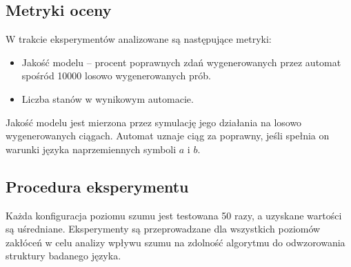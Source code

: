 \subsection{Metryki oceny}  
W trakcie eksperymentów analizowane są następujące metryki:  
\begin{itemize}  
    \item Jakość modelu – procent poprawnych zdań wygenerowanych przez automat spośród 10000 losowo wygenerowanych prób.  
    \item Liczba stanów w wynikowym automacie.  
\end{itemize}  

Jakość modelu jest mierzona przez symulację jego działania na losowo wygenerowanych ciągach. Automat uznaje ciąg za poprawny, jeśli spełnia on warunki języka naprzemiennych symboli \( a \) i \( b \).  

\subsection{Procedura eksperymentu}  
Każda konfiguracja poziomu szumu jest testowana 50 razy, a uzyskane wartości są uśredniane. Eksperymenty są przeprowadzane dla wszystkich poziomów zakłóceń w celu analizy wpływu szumu na zdolność algorytmu do odwzorowania struktury badanego języka.  


